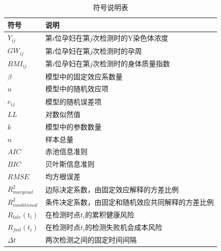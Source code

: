 \begin{table}[h!]
\centering
\caption{符号说明表}
\label{tab:符号说明}
\begin{tabular}{ll}
\toprule
符号 & 说明 \\
\midrule
$Y_{ij}$ & 第$i$位孕妇在第$j$次检测时的Y染色体浓度 \\
$GW_{ij}$ & 第$i$位孕妇在第$j$次检测时的孕周 \\
$BMI_{ij}$ & 第$i$位孕妇在第$j$次检测时的身体质量指数 \\
$\beta$ & 模型中的固定效应系数量 \\
$u$ & 模型中的随机效应项 \\
$e_{ij}$ & 模型的随机误差项 \\
$LL$ & 对数似然值 \\
$k$ & 模型中的参数数量 \\
$n$ & 样本总量 \\
$AIC$ & 赤池信息准则 \\
$BIC$ & 贝叶斯信息准则 \\
$RMSE$ & 均方根误差 \\
$R^2_{marginal}$ & 边际决定系数，由固定效应解释的方差比例 \\
$R^2_{conditional}$ & 条件决定系数，由固定和随机效应共同解释的方差比例 \\
$R_{late}(t_i)$ & 在检测时点$t_i$的累积健康风险 \\
$R_{fail}(t_i)$ & 在检测时点$t_i$的检测失败机会成本风险 \\
$\Delta t$ & 两次检测之间的固定时间间隔 \\

\bottomrule
\end{tabular}
\end{table}
